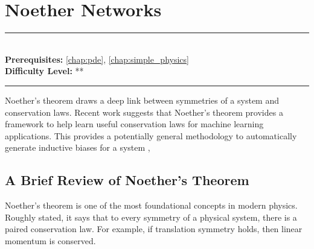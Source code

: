 \documentclass[book.tex]{subfiles}
\begin{document}
\chapter{Noether Networks}
\label{chap:noether_networks}
\noindent\rule{11cm}{0.4pt} \\
\textbf{Prerequisites:} \autoref{chap:pde}, \autoref{chap:simple_physics} \\
\textbf{Difficulty Level:} ** \\
\noindent\rule{11cm}{0.4pt}
\vspace{5mm}


Noether's theorem draws a deep link between symmetries of a system and conservation laws. Recent work suggests that Noether's theorem provides a framework to help learn useful conservation laws for machine learning applications. This provides a potentially general methodology to automatically generate inductive biases for a system \cite{alet2020tailoring}, \cite{alet2021noether}


\section{A Brief Review of Noether's Theorem}

Noether's theorem is one of the most foundational concepts in modern physics. Roughly stated, it says that to every symmetry of a physical system, there is a paired conservation law. For example, if translation symmetry holds, then linear momentum is conserved. 
\end{document}

